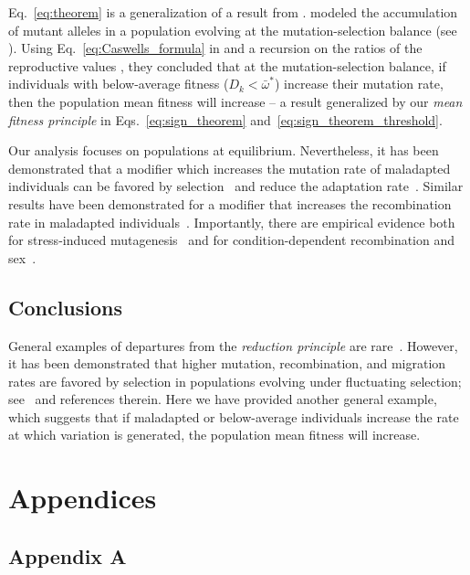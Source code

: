\documentclass[9pt, a4paper, twocolumn]{extarticle}
\begin{document}
Eq.~\ref{eq:theorem} is a generalization of a result from \citet[Eq.~4]{Ram2012}.
\citeauthor{Ram2012} modeled the accumulation of mutant alleles in a population evolving at the mutation-selection balance (see ).
Using Eq.~\ref{eq:Caswells_formula} in  and a recursion on the ratios of the reproductive values \cite[see][eqs.~A5-6]{Ram2012}, they concluded that at the mutation-selection balance, if individuals with below-average fitness ($D_k < \bar{\omega}^*$) increase their mutation rate, then the population mean fitness will increase -- a result generalized by our \emph{mean fitness principle} in Eqs.~\ref{eq:sign_theorem} and~\ref{eq:sign_theorem_threshold}.

Our analysis focuses on populations at equilibrium.
Nevertheless, it has been demonstrated that a modifier which increases the mutation rate of maladapted individuals can be favored by selection~\citep{Ram2012} and reduce the adaptation rate~\citep{Ram2014}.
Similar results have been demonstrated for a modifier that increases the recombination rate in maladapted individuals~\citep{Hadany2003a,Hadany2003b}.
Importantly, there are empirical evidence both for stress-induced mutagenesis~\citep{Rosenberg2012} and for condition-dependent recombination and sex~\citep{Ram2016}.

\subsection*{Conclusions}

General examples of departures from the \emph{reduction principle} are rare~\citep{Altenberg2017}.
However, it has been demonstrated that higher mutation, recombination, and migration rates are favored by selection in populations evolving under fluctuating selection; see~\citet{Carja2014} and references therein.
Here we have provided another general example, which suggests that if maladapted or below-average individuals increase the rate at which variation is generated, the population mean fitness will increase.

\section*{Appendices}
\subsection*{Appendix A}\label{sec:AppA}
\end{document}
